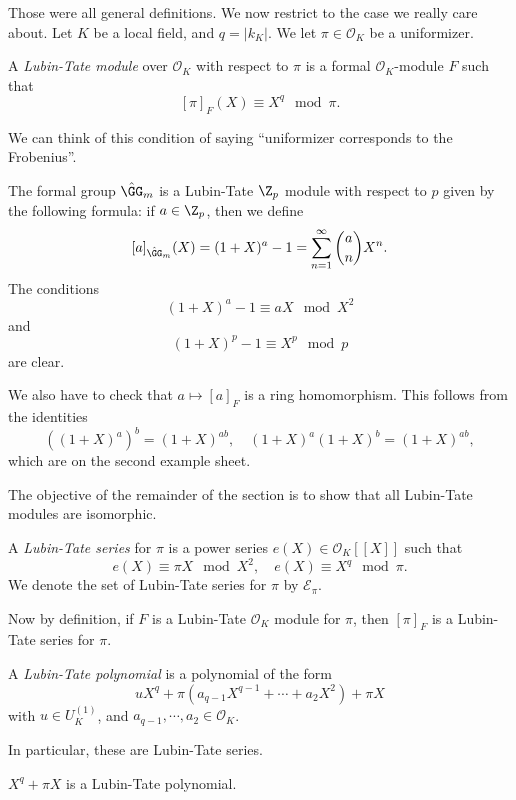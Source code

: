 \documentclass[a4paper]{article}
\begin{document}
Those were all general definitions. We now restrict to the case we really care about. Let $K$ be a local field, and $q = |k_K|$. We let $\pi \in \mathcal{O}_K$ be a uniformizer.
\begin{defi}
  A \emph{Lubin-Tate module} over $\mathcal{O}_K$ with respect to $\pi$ is a formal $\mathcal{O}_K$-module $F$ such that
  \[
    [\pi]_F (X) \equiv X^q\mod \pi.
  \]
\end{defi}
We can think of this condition of saying ``uniformizer corresponds to the Frobenius''.

\begin{eg}
  The formal group $\hat{\GG}_m$ is a Lubin-Tate $\Z_p$ module with respect to $p$ given by the following formula: if $a \in \Z_p$, then we define
  \[
    [a]_{\hat{\GG}_m}(X) = (1 + X)^a - 1 = \sum_{n = 1}^\infty \binom{a}{n} X^n.
  \]
  The conditions
  \[
    (1 + X)^a - 1 \equiv aX \mod X^2
  \]
  and
  \[
    (1 + X)^p - 1 \equiv X^p \mod p
  \]
  are clear.

  We also have to check that $a \mapsto [a]_F$ is a ring homomorphism. This follows from the identities
  \[
    ((1 + X)^a)^b = (1 + X)^{ab},\quad (1 + X)^a (1 + X)^b = (1 + X)^{ab},
  \]
  which are on the second example sheet.
\end{eg}

The objective of the remainder of the section is to show that all Lubin-Tate modules are isomorphic.
\begin{defi}
  A \emph{Lubin-Tate series} for $\pi$ is a power series $e(X) \in \mathcal{O}_K[[X]]$ such that
  \[
    e(X) \equiv \pi X \mod X^2,\quad e(X) \equiv X^q\mod \pi.
  \]
  We denote the set of Lubin-Tate series for $\pi$ by $\mathcal{E}_\pi$.
\end{defi}
Now by definition, if $F$ is a Lubin-Tate $\mathcal{O}_K$ module for $\pi$, then $[\pi]_F$ is a Lubin-Tate series for $\pi$.

\begin{defi}
  A \emph{Lubin-Tate polynomial} is a polynomial of the form
  \[
    uX^q + \pi(a_{q - 1} X^{q - 1} + \cdots + a_2 X^2) + \pi X
  \]
  with $u \in U_K^{(1)}$, and $a_{q-1}, \cdots, a_2 \in \mathcal{O}_K$.

  In particular, these are Lubin-Tate series.
\end{defi}

\begin{eg}
  $X^q + \pi X$ is a Lubin-Tate polynomial.
\end{eg}
\end{document}
